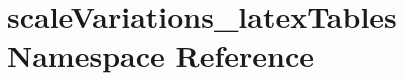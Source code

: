 \hypertarget{namespacescaleVariations__latexTables}{
\section{scaleVariations\_\-latexTables Namespace Reference}
\label{namespacescaleVariations__latexTables}
}
